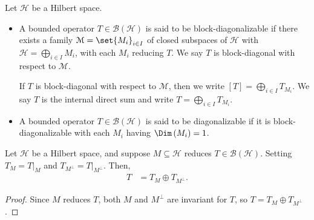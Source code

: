 \documentclass[10pt]{mypackage}
\begin{document}
\begin{definition}
  Let $\mathcal{H}$ be a Hilbert space.
  \begin{itemize}
    \item A bounded operator $T\in \mathcal{B}\left(\mathcal{H}\right)$ is said to be block-diagonalizable if there exists a family $\mathcal{M} = \set{M_i}_{i\in I}$ of closed subspaces of $\mathcal{H}$ with $\mathcal{H} = \bigoplus_{i\in I}M_i$, with each $M_i$ reducing $T$. We say $T$ is block-diagonal with respect to $\mathcal{M}$.\newline

      If $T$ is block-diagonal with respect to $\mathcal{M}$, then we write $\left[T\right] = \bigoplus_{i\in I}T_{M_i}$. We say $T$ is the internal direct sum and write $T = \bigoplus_{i\in I}T_{M_i}$.
    \item A bounded operator $T\in \mathcal{B}\left(\mathcal{H}\right)$ is said to be diagonalizable if it is block-diagonalizable with each $M_i$ having $\Dim\left(M_i\right) = 1$.
  \end{itemize}
\end{definition}
\begin{proposition}
  Let $\mathcal{H}$ be a Hilbert space, and suppose $M\subseteq \mathcal{H}$ reduces $T\in \mathcal{B}\left(\mathcal{H}\right)$. Setting $T_M = T|_{M}$ and $T_{M^{\perp}} = T|_{M^{\perp}}$. Then,
  \begin{align*}
    T &= T_{M}\oplus T_{M^{\perp}}.
  \end{align*}
\end{proposition}
\begin{proof}
  Since $M$ reduces $T$, both $M$ and $M^{\perp}$ are invariant for $T$, so $T = T_{M} \oplus T_{M^{\perp}}$.
\end{proof}
\end{document}
